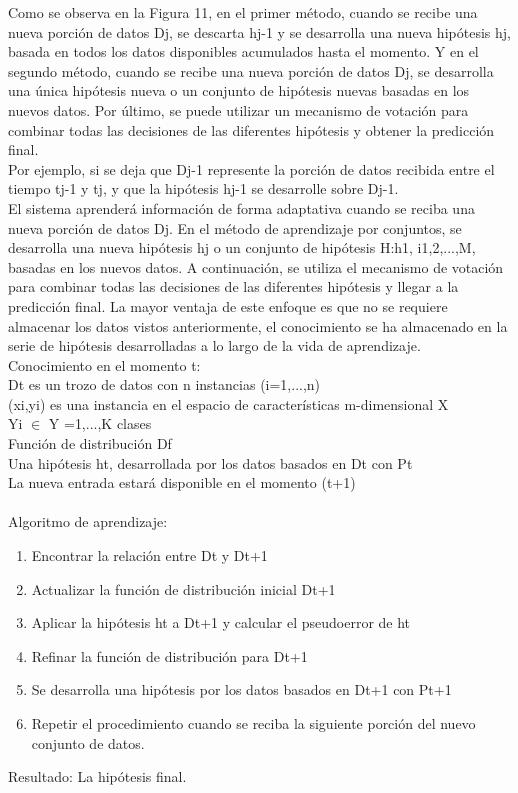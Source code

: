 		Como se observa en la Figura 11, en el primer método, cuando se recibe una nueva porción de datos Dj, se descarta hj-1 y se desarrolla una nueva hipótesis hj, basada en todos los datos disponibles acumulados hasta el momento. 
		Y en el segundo método, cuando se recibe una nueva porción de datos Dj, se desarrolla una única hipótesis nueva o un conjunto de hipótesis nuevas basadas en los nuevos datos. 
		Por último, se puede utilizar un mecanismo de votación para combinar todas las decisiones de las diferentes hipótesis y obtener la predicción final.\\
		
		Por ejemplo, si se deja que Dj-1 represente la porción de datos recibida entre el tiempo tj-1 y tj, y que la hipótesis hj-1 se desarrolle sobre Dj-1.\\
		El sistema aprenderá información de forma adaptativa cuando se reciba una nueva porción de datos Dj.	
		En el método de aprendizaje por conjuntos, se desarrolla una nueva hipótesis hj o un conjunto de hipótesis H:h1, i1,2,...,M, basadas en los nuevos datos.  
		A continuación, se utiliza el mecanismo de votación para combinar todas las decisiones de las diferentes hipótesis y llegar a la predicción final.
		La mayor ventaja de este enfoque es que no se requiere almacenar los datos vistos anteriormente, el conocimiento se ha almacenado en la serie de hipótesis desarrolladas a lo largo de la vida de aprendizaje.\\
		
			Conocimiento en el momento t: \\
			Dt es un trozo de datos con n instancias (i=1,...,n) \\
			(xi,yi) es una instancia en el espacio de características m-dimensional X\\ 
			Yi $\in$ Y ={1,...,K} clases \\
			Función de distribución Df \\
			Una hipótesis ht, desarrollada por los datos basados en Dt con Pt \\
			La nueva entrada estará disponible en el momento (t+1) \\\\
			
			Algoritmo de aprendizaje:\\
			\begin{enumerate}
				\item Encontrar la relación entre Dt y Dt+1
				\item Actualizar la función de distribución inicial Dt+1
				\item Aplicar la hipótesis ht a Dt+1 y calcular el pseudoerror de ht
				\item Refinar la función de distribución para Dt+1
				\item Se desarrolla una hipótesis por los datos basados en Dt+1 con Pt+1
				\item Repetir el procedimiento cuando se reciba la siguiente porción del nuevo conjunto de datos.
			\end{enumerate}
			Resultado: La hipótesis final.\\
		  

